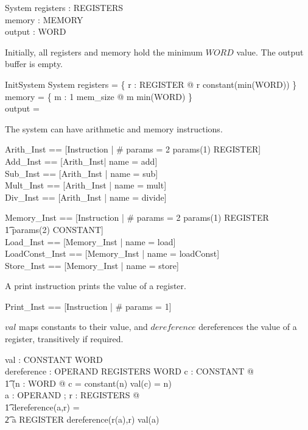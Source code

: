 \documentclass{article}
\begin{document}
\begin{schema}{System}
  registers : REGISTERS\\
  memory : MEMORY\\
  output : \seq WORD
\end{schema}

Initially, all registers and memory hold the minimum $WORD$ value. The
output buffer is empty.

\begin{schema}{InitSystem}
  System
\where
  registers = \{ r : REGISTER @ r \mapsto constant(min(WORD)) \}\\
  memory = \{ m : 1 \upto mem\_size @ m \mapsto min(WORD) \}\\
  output = \langle \rangle
\end{schema}

The system can have arithmetic and memory instructions.

\begin{zed}
  Arith\_Inst == [Instruction | \# params = 2 \land params(1) \in REGISTER]\\
  Add\_Inst == [Arith\_Inst| name = add]\\
  Sub\_Inst == [Arith\_Inst | name = sub]\\
  Mult\_Inst == [Arith\_Inst | name = mult]\\
  Div\_Inst == [Arith\_Inst | name = divide]
\end{zed}

\begin{zed}
  Memory\_Inst == [Instruction | \# params = 2 \land params(1) \in REGISTER \\
    \t1 \land params(2) \in CONSTANT]\\
  Load\_Inst == [Memory\_Inst | name = load]\\
  LoadConst\_Inst == [Memory\_Inst | name = loadConst]\\
  Store\_Inst == [Memory\_Inst | name = store]
\end{zed}

A print instruction prints the value of a register.

\begin{zed}
  Print\_Inst == [Instruction | \# params = 1]
\end{zed}

$val$ maps constants to their value, and $dereference$ dereferences
the value of a register, transitively if required.

\begin{axdef}
  val : CONSTANT \fun WORD\\
  dereference : OPERAND \cross REGISTERS \fun WORD
\where
  \forall c : CONSTANT @ \\
    \t1 (\exists n : WORD @ c = constant(n) \land val(c) = n)\\
  \forall a : OPERAND ; r : REGISTERS @ \\
    \t1 dereference(a,r) = \\
      \t2 \IF a \in REGISTER \THEN dereference(r(a),r) \ELSE val(a)
\end{axdef}
\end{document}
